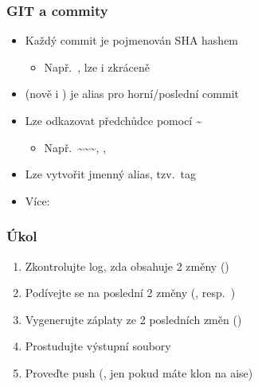 \begin{frame}
  \frametitle{GIT a commity}

  \begin{itemize}
    \item Každý commit je pojmenován SHA hashem
    \begin{itemize}
      \item Např.\ , lze i
	zkráceně 
    \end{itemize}

    \pause

    \item {} (nově i ) je alias pro horní/poslední commit

    \pause

    \item Lze odkazovat předchůdce pomocí \textasciitilde
    \begin{itemize}
      \item Např.\ \textasciitilde\textasciitilde\textasciitilde,
	, 
    \end{itemize}

    \pause

    \item Lze vytvořit jmenný alias, tzv.\ tag

    \pause

    \item Více: 

  \end{itemize}

\end{frame}

\begin{frame}
  \frametitle{Úkol}

  \begin{enumerate}
    \item Zkontrolujte log, zda obsahuje 2 změny ()
    \item Podívejte se na poslední 2 změny (,
      resp.\ )

    \pause

    \item Vygenerujte záplaty ze 2 posledních změn ()
    \item Prostudujte výstupní soubory

    \iffimuni
      \pause

      \item Proveďte push (, jen pokud máte klon na aise)
    \fi

  \end{enumerate}

   \fi

\end{frame}

